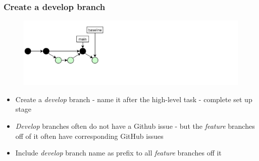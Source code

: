\documentclass[aspectratio=169]{beamer} %
\begin{document}
\begin{frame}
	\frametitle{Create a develop branch}

	\vspace{-.5cm}
	\begin{minipage}[t][5cm][t]{\textwidth}
		\begin{figure}
			\centering
			\includegraphics[width=\textwidth]{./img/dime-gitflow-network-2-1.png}
		\end{figure}
	\end{minipage}

	\vspace{-.5cm}
	\begin{minipage}[t][5cm][t]{\textwidth}
		\begin{itemize}
			\setlength\itemsep{.5em}
			\item Create a \textit{develop} branch
			- name it after the high-level task
			- complete set up stage
			\item \textit{Develop} branches often do not have a Github issue
			- but the \textit{feature} branches off of it
			often have corresponding GitHub issues
			\item Include \textit{develop} branch name as prefix
			to all \textit{feature} branches off it
		\end{itemize}
	\end{minipage}
\end{frame}
\end{document}
